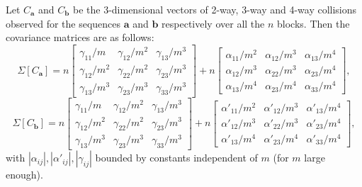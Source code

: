 \documentclass[10pt]{article} %
\theoremstyle{plain}
\newcommand{\ba}{\textbf{a}}
\newcommand{\bb}{\textbf{b}}
\begin{document}
\begin{claim}
	\label{claim:cov_match}
	Let $C_{\ba}$ and $C_{\bb}$  be the 3-dimensional vectors of 2-way, 3-way and 4-way collisions observed for the sequences $\ba$ and $\bb$ respectively over all the $n$ blocks. Then the covariance matrices are as follows:
	$$
	\Sigma\left[C_{\ba}\right] = 
	n
	\begin{bmatrix}
		\gamma_{11}/m & \gamma_{12}/m^2 & \gamma_{13}/m^3\\
		\gamma_{12}/m^2 & \gamma_{22}/m^2 & \gamma_{23}/m^3 \\
		\gamma_{13}/m^3 & \gamma_{23}/m^3 & \gamma_{33}/m^3
	\end{bmatrix}
	+
	n
	\begin{bmatrix}
		\alpha_{11}/m^2 & \alpha_{12}/m^3 & \alpha_{13}/m^4\\
		\alpha_{12}/m^3 & \alpha_{22}/m^3 & \alpha_{23}/m^4 \\
		\alpha_{13}/m^4 & \alpha_{23}/m^4 & \alpha_{33}/m^4
	\end{bmatrix},
	$$
	$$
	\Sigma\left[C_{\bb}\right] = n\begin{bmatrix}
		\gamma_{11}/m & \gamma_{12}/m^2 & \gamma_{13}/m^3\\
		\gamma_{12}/m^2 & \gamma_{22}/m^2 & \gamma_{23}/m^3 \\
		\gamma_{13}/m^3 & \gamma_{23}/m^3 & \gamma_{33}/m^3
	\end{bmatrix}
	+
	n
	\begin{bmatrix}
		\alpha'_{11}/m^2 & \alpha'_{12}/m^3 & \alpha'_{13}/m^4\\
		\alpha'_{12}/m^3 & \alpha'_{22}/m^3 & \alpha'_{23}/m^4 \\
		\alpha'_{13}/m^4 & \alpha'_{23}/m^4 & \alpha'_{33}/m^4
	\end{bmatrix},
	$$
	with $|\alpha_{ij}|, |\alpha'_{ij}|, |\gamma_{ij}|$ bounded by constants independent of $m$ (for $m$ large enough).
\end{claim}
\end{document}
